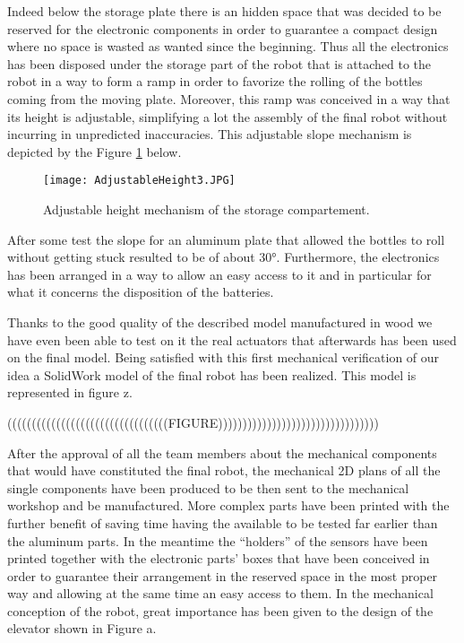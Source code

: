 Indeed below the storage plate there is an hidden space that was decided to be reserved for the electronic components in order to guarantee a compact design where no space is wasted as wanted since  the beginning.
Thus all the electronics has been disposed under the storage part of the robot that is attached to the robot in a way to form a ramp in order to favorize the rolling of the bottles coming from the moving plate.
Moreover, this ramp was conceived in a way that its height is adjustable, simplifying a lot the assembly of the final robot without incurring in unpredicted inaccuracies.
This adjustable slope mechanism is depicted by the Figure \ref{fig:AdjustableHeight3} below.

\begin{figure}[H]
 \centering
 \texttt{[image: AdjustableHeight3.JPG]}
 \caption{Adjustable height mechanism of the storage compartement.}
\label{fig:AdjustableHeight3}
\end{figure}

After some test the slope for an aluminum plate that allowed the bottles to roll without getting stuck resulted to be of about 30°.
Furthermore, the electronics has been arranged in a way to allow an easy access to it and in particular for what it concerns the disposition of the batteries.

Thanks to the good quality of the described model manufactured in wood we have even been able to test on it the real actuators that afterwards has been used on the final model.
Being satisfied with this first mechanical verification of our idea a SolidWork model of the final robot has been realized.
This model is represented in figure z.

(((((((((((((((((((((((((((((((((FIGURE)))))))))))))))))))))))))))))))))







After the approval of all the team members about the mechanical components that would have constituted the final robot, the mechanical 2D plans of all the single components have been produced to be then sent to the mechanical workshop and be manufactured.
More complex parts have been printed with the further benefit of saving time having the available to be tested far earlier than the aluminum parts.
 In the meantime the “holders” of the sensors have been printed together with the electronic parts’ boxes that have been conceived in order to guarantee their arrangement in the reserved space in the most proper way and allowing at the same time an easy access to them.
In the mechanical conception of the robot, great importance has been given to the design of the elevator shown in Figure a.

